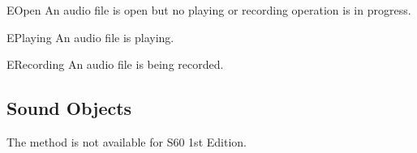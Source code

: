 \begin{datadesc}{EOpen} 
An audio file is open but no playing or recording operation is in progress.
\end{datadesc}

\begin{datadesc}{EPlaying} 
An audio file is playing.
\end{datadesc}

\begin{datadesc}{ERecording}
An audio file is being recorded.
\end{datadesc}

\subsection{Sound Objects}
\label{subsec:sound}

\begin{notice}[note]
The method  is not available for S60 1st 
Edition.
\end{notice}

